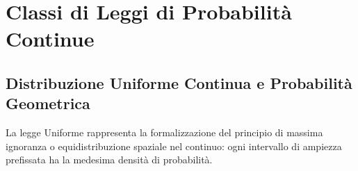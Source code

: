 \chapter{Classi di Leggi di Probabilità Continue}
\label{cap:classi_di_leggi_continue}

\begin{abstract}
Il presente capitolo espone in modo rigoroso ed esaustivo le principali famiglie di variabili aleatorie continue. Partendo dalla legge Uniforme continua (con applicazioni al calcolo delle probabilità geometriche), si analizza l'Esponenziale e la sua proprietà di assenza di memoria nel continuo, nonché la legge del minimo di esponenziali indipendenti per sistemi affidabilistici in serie. Si approfondisce la distribuzione Normale Gaussiana, regina della statistica, esplicitando i metodi operativi di standardizzazione, le proprietà di simmetria e la celebre Regola Empirica. Infine, si deducono e si contestualizzano le tre distribuzioni pivotali cardine dell'inferenza statistica: la Chi-quadro ($\chi^2$), la $t$ di Student e la $F$ di Fisher-Snedecor.
\end{abstract}

\section{Distribuzione Uniforme Continua e Probabilità Geometrica}
\label{sec:uniforme_continua}

La legge Uniforme rappresenta la formalizzazione del principio di massima ignoranza o equidistribuzione spaziale nel continuo: ogni intervallo di ampiezza prefissata ha la medesima densità di probabilità.

